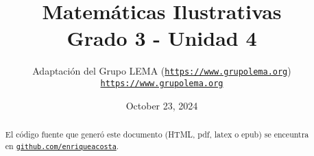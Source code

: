 \documentclass[twoside,10pt,]{article}
\title{Matemáticas Ilustrativas\\
{\large Grado 3 - Unidad 4}}
\author{Adaptación del Grupo LEMA (\href{https://www.grupolema.org}{\nolinkurl{https://www.grupolema.org}})\\
\href{https://www.grupolema.org}{\nolinkurl{https://www.grupolema.org}}
}
\date{October 23, 2024}
\begin{document}
\raggedbottom
\label{gra3-uni4}\hypertarget{gra3-uni4}{}
\maketitle
\thispagestyle{empty}
\renewcommand*{\abstractname}{Resumen}
\begin{abstract}
\end{abstract}
\renewcommand*{\abstractname}{Resumen}
\begin{abstract}
El código fuente que generó este documento (HTML, pdf, latex o epub) se enceuntra en \href{https://github.com/enriqueacosta/IllustrativeMath-GrupoLEMA}{\nolinkurl{github.com/enriqueacosta}}.%
\end{abstract}
\renewcommand*{\abstractname}{Resumen}
\end{document}

